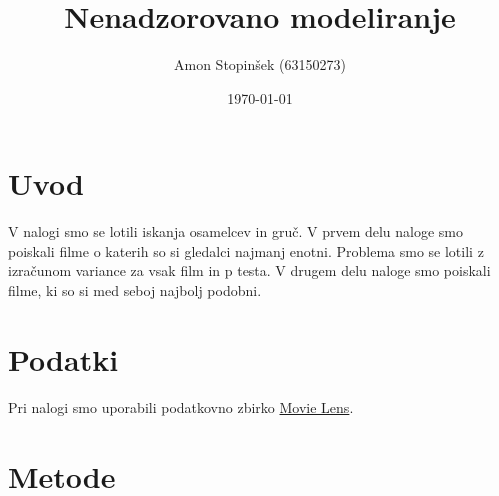 \documentclass[a4paper,11pt]{article}
\title{Nenadzorovano modeliranje}
\author{Amon Stopinšek (63150273)}
\date{\today}
\begin{document}
\maketitle

\section{Uvod}

V nalogi smo se lotili iskanja osamelcev in gruč. V prvem delu naloge smo
poiskali filme o katerih so si gledalci najmanj enotni. Problema smo se lotili
z izračunom variance za vsak film in p testa. V drugem delu naloge smo poiskali
filme, ki so si med seboj najbolj podobni.

\section{Podatki}


Pri nalogi smo uporabili podatkovno zbirko
\href{https://grouplens.org/datasets/movielens/}{Movie Lens}.

\section{Metode}

%
%
%
%
\end{document}
